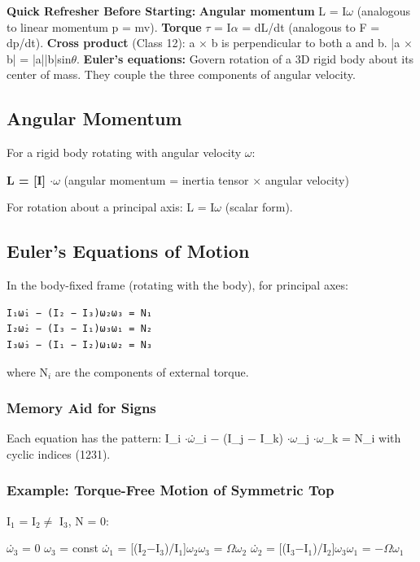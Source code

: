 \documentclass[12pt,a4paper,openany]{book}
\begin{document}
{{\begin{prereqbox}
 \textbf{Quick Refresher Before Starting:}
\textbf{Angular momentum} L = I$\omega$ (analogous to linear momentum p = mv).
\textbf{Torque} $\tau$ = I$\alpha$ = dL/dt (analogous to F = dp/dt).
\textbf{Cross product} (Class 12): a $\times$ b is perpendicular to both a and b. |a $\times$ b| = |a||b|sin$\theta$.
\textbf{Euler's equations:} Govern rotation of a 3D rigid body about its center of mass. They couple the three components of angular velocity.
\end{prereqbox}


\subsection{Angular Momentum }

For a rigid body rotating with angular velocity \textbf{$\omega$}:

\textbf{L = [I] $\cdot\omega$} (angular momentum = inertia tensor $\times$ angular velocity)

For rotation about a principal axis: L = I$\omega$ (scalar form).

\subsection{Euler's Equations of Motion }

In the body-fixed frame (rotating with the body), for principal axes:

\begin{verbatim}
I₁ω̇₁ − (I₂ − I₃)ω₂ω₃ = N₁
I₂ω̇₂ − (I₃ − I₁)ω₃ω₁ = N₂
I₃ω̇₃ − (I₁ − I₂)ω₁ω₂ = N₃
\end{verbatim}

where N$_i$ are the components of external torque.

\subsubsection{ Memory Aid for Signs}
Each equation has the pattern: I_i $\cdot\omega$̇_i − (I_j − I_k) $\cdot\omega$_j $\cdot\omega$_k = N_i with cyclic indices (1231).

\subsubsection{Example: Torque-Free Motion of Symmetric Top}
I$_1$ = I$_2\neq$ I$_3$, N = 0:

$\omega$̇$_3$ = 0  $\omega_3$ = const
$\omega$̇$_1$ = [(I$_2$−I$_3$)/I$_1$]$\omega_2\omega_3$ = $\Omega\omega_2$
$\omega$̇$_2$ = [(I$_3$−I$_1$)/I$_2$]$\omega_3\omega_1$ = −$\Omega\omega_1$

}}
\end{document}

